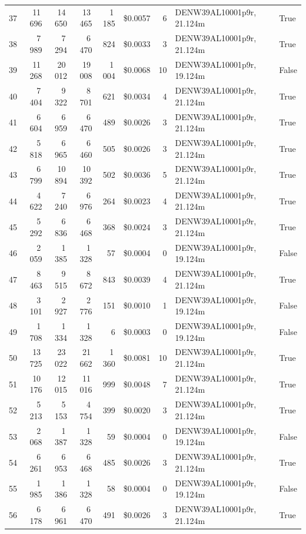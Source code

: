 \documentclass[a4paper,11pt]{article}
\begin{document}
\begin{table}[ht]
\begin{tabular}{r r r r r r r p{3cm} l}
37 & 11\,696 & 14\,650 & 13\,465 & 1\,185 & \$0.0057 & 6 & DENW39AL10001p9r, 21.124m & True \\
38 & 7\,989 & 7\,294 & 6\,470 & 824 & \$0.0033 & 3 & DENW39AL10001p9r, 21.124m & True \\
39 & 11\,268 & 20\,012 & 19\,008 & 1\,004 & \$0.0068 & 10 & DENW39AL10001p9r, 19.124m & False \\
40 & 7\,404 & 9\,322 & 8\,701 & 621 & \$0.0034 & 4 & DENW39AL10001p9r, 21.124m & True \\
41 & 6\,604 & 6\,959 & 6\,470 & 489 & \$0.0026 & 3 & DENW39AL10001p9r, 21.124m & True \\
42 & 5\,818 & 6\,965 & 6\,460 & 505 & \$0.0026 & 3 & DENW39AL10001p9r, 21.124m & True \\
43 & 6\,799 & 10\,894 & 10\,392 & 502 & \$0.0036 & 5 & DENW39AL10001p9r, 21.124m & True \\
44 & 4\,622 & 7\,240 & 6\,976 & 264 & \$0.0023 & 4 & DENW39AL10001p9r, 21.124m & True \\
45 & 5\,292 & 6\,836 & 6\,468 & 368 & \$0.0024 & 3 & DENW39AL10001p9r, 21.124m & True \\
46 & 2\,059 & 1\,385 & 1\,328 & 57 & \$0.0004 & 0 & DENW39AL10001p9r, 19.124m & False \\
47 & 8\,463 & 9\,515 & 8\,672 & 843 & \$0.0039 & 4 & DENW39AL10001p9r, 21.124m & True \\
48 & 3\,101 & 2\,927 & 2\,776 & 151 & \$0.0010 & 1 & DENW39AL10001p9r, 19.124m & False \\
49 & 1\,708 & 1\,334 & 1\,328 & 6 & \$0.0003 & 0 & DENW39AL10001p9r, 19.124m & False \\
50 & 13\,725 & 23\,022 & 21\,662 & 1\,360 & \$0.0081 & 10 & DENW39AL10001p9r, 21.124m & True \\
51 & 10\,176 & 12\,015 & 11\,016 & 999 & \$0.0048 & 7 & DENW39AL10001p9r, 21.124m & True \\
52 & 5\,213 & 5\,153 & 4\,754 & 399 & \$0.0020 & 3 & DENW39AL10001p9r, 21.124m & True \\
53 & 2\,068 & 1\,387 & 1\,328 & 59 & \$0.0004 & 0 & DENW39AL10001p9r, 19.124m & False \\
54 & 6\,261 & 6\,953 & 6\,468 & 485 & \$0.0026 & 3 & DENW39AL10001p9r, 21.124m & True \\
55 & 1\,985 & 1\,386 & 1\,328 & 58 & \$0.0004 & 0 & DENW39AL10001p9r, 19.124m & False \\
56 & 6\,178 & 6\,961 & 6\,470 & 491 & \$0.0026 & 3 & DENW39AL10001p9r, 21.124m & True \\

\end{tabular}
\end{table}
\end{document}
